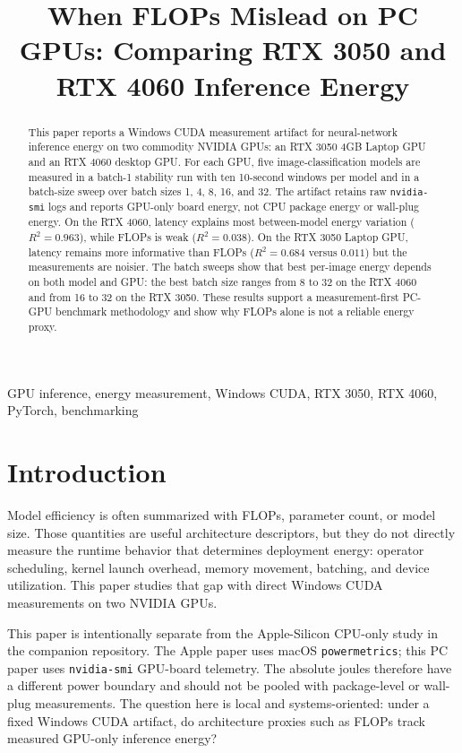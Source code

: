 \documentclass[conference]{IEEEtran}
\begin{document}
\title{When FLOPs Mislead on PC GPUs: Comparing RTX 3050 and RTX 4060 Inference Energy}

\author{}

\maketitle

\begin{abstract}
This paper reports a Windows CUDA measurement artifact for neural-network
inference energy on two commodity NVIDIA GPUs: an RTX 3050 4GB Laptop GPU and
an RTX 4060 desktop GPU. For each GPU, five image-classification models are
measured in a batch-1 stability run with ten 10-second windows per model and
in a batch-size sweep over batch sizes 1, 4, 8, 16, and 32. The artifact
retains raw \texttt{nvidia-smi} logs and reports GPU-only board energy, not CPU
package energy or wall-plug energy. On the RTX 4060, latency explains most
between-model energy variation ($R^2=0.963$), while FLOPs is weak
($R^2=0.038$). On the RTX 3050 Laptop GPU, latency remains more informative
than FLOPs ($R^2=0.684$ versus $0.011$) but the measurements are noisier. The
batch sweeps show that best per-image energy depends on both model and GPU:
the best batch size ranges from 8 to 32 on the RTX 4060 and from 16 to 32 on
the RTX 3050. These results support a measurement-first PC-GPU benchmark
methodology and show why FLOPs alone is not a reliable energy proxy.
\end{abstract}

\begin{IEEEkeywords}
GPU inference, energy measurement, Windows CUDA, RTX 3050, RTX 4060, PyTorch,
benchmarking
\end{IEEEkeywords}

\section{Introduction}

Model efficiency is often summarized with FLOPs, parameter count, or model
size. Those quantities are useful architecture descriptors, but they do not
directly measure the runtime behavior that determines deployment energy:
operator scheduling, kernel launch overhead, memory movement, batching, and
device utilization. This paper studies that gap with direct Windows CUDA
measurements on two NVIDIA GPUs.

This paper is intentionally separate from the Apple-Silicon CPU-only study in
the companion repository. The Apple paper uses macOS \texttt{powermetrics};
this PC paper uses \texttt{nvidia-smi} GPU-board telemetry. The absolute joules
therefore have a different power boundary and should not be pooled with
package-level or wall-plug measurements. The question here is local and
systems-oriented: under a fixed Windows CUDA artifact, do architecture proxies
such as FLOPs track measured GPU-only inference energy?
\end{document}
